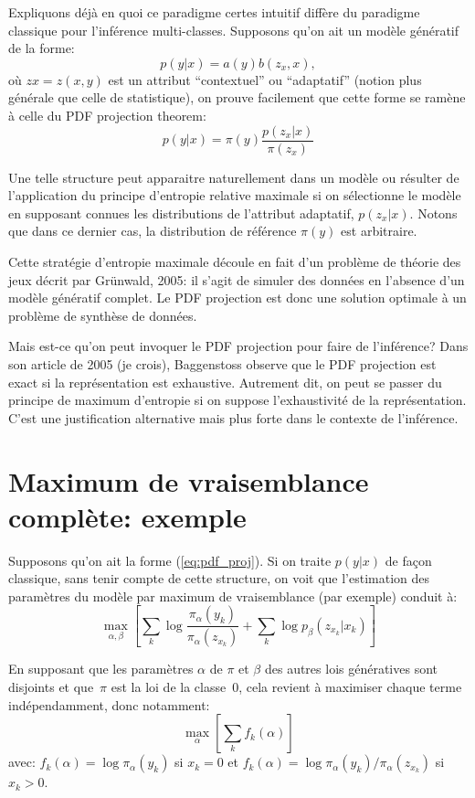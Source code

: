 \documentclass{article}
\begin{document}
Expliquons d\'ej\`a en quoi ce paradigme certes intuitif diff\`ere du paradigme classique pour l'inf\'erence multi-classes. Supposons qu'on ait un mod\`ele g\'en\'eratif de la forme: 
$$
p(y|x) = a(y) b(z_x, x),
$$ 
o\`u $zx = z(x, y)$ est un attribut ``contextuel'' ou ``adaptatif'' (notion plus g\'en\'erale que celle de statistique), on prouve facilement que cette forme se ram\`ene \`a celle du PDF projection theorem: 
\begin{equation}
\label{eq:pdf_proj}
p(y|x) = \pi(y) \frac{p(z_x|x)}{\pi(z_x)}
\end{equation}

Une telle structure peut apparaitre naturellement dans un mod\`ele ou r\'esulter de l'application du principe d'entropie relative maximale si on s\'electionne le mod\`ele en supposant connues les distributions de l'attribut adaptatif, $p(z_x|x)$. Notons que dans ce dernier cas, la distribution de r\'ef\'erence $\pi(y)$ est arbitraire.

Cette strat\'egie d'entropie maximale d\'ecoule en fait d'un probl\`eme de th\'eorie des jeux d\'ecrit par Gr\"unwald, 2005: il s'agit de simuler des donn\'ees en l'absence d'un mod\`ele g\'en\'eratif complet. Le PDF projection est donc une solution optimale \`a un probl\`eme de synth\`ese de donn\'ees.

Mais est-ce qu'on peut invoquer le PDF projection pour faire de l'inf\'erence? Dans son article de 2005 (je crois), Baggenstoss observe que le PDF projection est exact si la repr\'esentation est exhaustive. Autrement dit, on peut se passer du principe de maximum d'entropie si on suppose l'exhaustivit\'e de la repr\'esentation. C'est une justification alternative mais plus forte dans le contexte de l'inf\'erence.


\section{Maximum de vraisemblance compl\`ete: exemple}

Supposons qu'on ait la forme (\ref{eq:pdf_proj}). Si on traite $p(y|x)$ de fa\c{c}on classique, sans tenir compte de cette structure, on voit que l'estimation des param\`etres du mod\`ele par maximum de vraisemblance (par exemple) conduit \`a: 
$$
\max_{\alpha, \beta} \left[
\sum_k \log \frac{\pi_\alpha(y_k)}{\pi_\alpha(z_{x_k})} + \sum_k \log p_\beta(z_{x_k}|x_k)
\right]
$$ 

En supposant que les param\`etres $\alpha$ de $\pi$ et $\beta$ des autres lois g\'en\'eratives sont disjoints et que~$\pi$ est la loi de la classe~0, cela revient \`a maximiser chaque terme ind\'ependamment, donc notamment: 
$$
\max_\alpha \left[
\sum_k f_k(\alpha)
\right]
$$ 
avec: $ f_k(\alpha) = \log \pi_\alpha(y_k)$  si $x_k = 0$ et $f_k(\alpha) = \log \pi_\alpha(y_k)/\pi_\alpha(z_{x_k})$ si $x_k > 0$.
\end{document}
